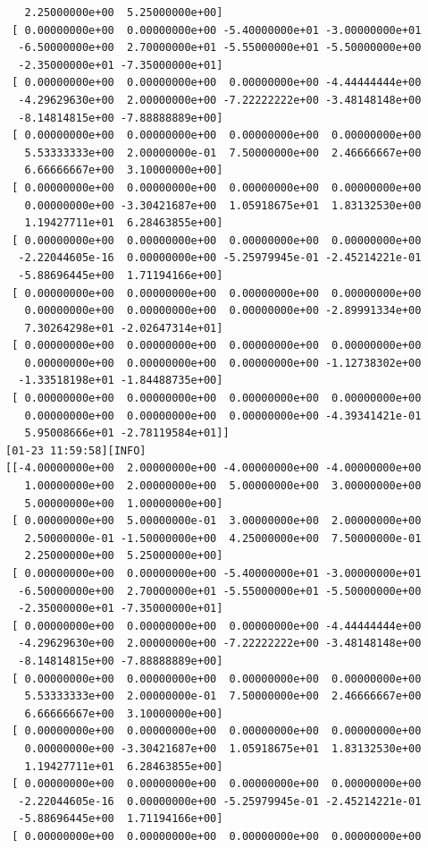 \documentclass[
  letterpaper,
  DIV=11,
  numbers=noendperiod]{scrartcl}
\begin{document}
\begin{verbatim}
   2.25000000e+00  5.25000000e+00]
 [ 0.00000000e+00  0.00000000e+00 -5.40000000e+01 -3.00000000e+01
  -6.50000000e+00  2.70000000e+01 -5.55000000e+01 -5.50000000e+00
  -2.35000000e+01 -7.35000000e+01]
 [ 0.00000000e+00  0.00000000e+00  0.00000000e+00 -4.44444444e+00
  -4.29629630e+00  2.00000000e+00 -7.22222222e+00 -3.48148148e+00
  -8.14814815e+00 -7.88888889e+00]
 [ 0.00000000e+00  0.00000000e+00  0.00000000e+00  0.00000000e+00
   5.53333333e+00  2.00000000e-01  7.50000000e+00  2.46666667e+00
   6.66666667e+00  3.10000000e+00]
 [ 0.00000000e+00  0.00000000e+00  0.00000000e+00  0.00000000e+00
   0.00000000e+00 -3.30421687e+00  1.05918675e+01  1.83132530e+00
   1.19427711e+01  6.28463855e+00]
 [ 0.00000000e+00  0.00000000e+00  0.00000000e+00  0.00000000e+00
  -2.22044605e-16  0.00000000e+00 -5.25979945e-01 -2.45214221e-01
  -5.88696445e+00  1.71194166e+00]
 [ 0.00000000e+00  0.00000000e+00  0.00000000e+00  0.00000000e+00
   0.00000000e+00  0.00000000e+00  0.00000000e+00 -2.89991334e+00
   7.30264298e+01 -2.02647314e+01]
 [ 0.00000000e+00  0.00000000e+00  0.00000000e+00  0.00000000e+00
   0.00000000e+00  0.00000000e+00  0.00000000e+00 -1.12738302e+00
  -1.33518198e+01 -1.84488735e+00]
 [ 0.00000000e+00  0.00000000e+00  0.00000000e+00  0.00000000e+00
   0.00000000e+00  0.00000000e+00  0.00000000e+00 -4.39341421e-01
   5.95008666e+01 -2.78119584e+01]]
[01-23 11:59:58][INFO] 
[[-4.00000000e+00  2.00000000e+00 -4.00000000e+00 -4.00000000e+00
   1.00000000e+00  2.00000000e+00  5.00000000e+00  3.00000000e+00
   5.00000000e+00  1.00000000e+00]
 [ 0.00000000e+00  5.00000000e-01  3.00000000e+00  2.00000000e+00
   2.50000000e-01 -1.50000000e+00  4.25000000e+00  7.50000000e-01
   2.25000000e+00  5.25000000e+00]
 [ 0.00000000e+00  0.00000000e+00 -5.40000000e+01 -3.00000000e+01
  -6.50000000e+00  2.70000000e+01 -5.55000000e+01 -5.50000000e+00
  -2.35000000e+01 -7.35000000e+01]
 [ 0.00000000e+00  0.00000000e+00  0.00000000e+00 -4.44444444e+00
  -4.29629630e+00  2.00000000e+00 -7.22222222e+00 -3.48148148e+00
  -8.14814815e+00 -7.88888889e+00]
 [ 0.00000000e+00  0.00000000e+00  0.00000000e+00  0.00000000e+00
   5.53333333e+00  2.00000000e-01  7.50000000e+00  2.46666667e+00
   6.66666667e+00  3.10000000e+00]
 [ 0.00000000e+00  0.00000000e+00  0.00000000e+00  0.00000000e+00
   0.00000000e+00 -3.30421687e+00  1.05918675e+01  1.83132530e+00
   1.19427711e+01  6.28463855e+00]
 [ 0.00000000e+00  0.00000000e+00  0.00000000e+00  0.00000000e+00
  -2.22044605e-16  0.00000000e+00 -5.25979945e-01 -2.45214221e-01
  -5.88696445e+00  1.71194166e+00]
 [ 0.00000000e+00  0.00000000e+00  0.00000000e+00  0.00000000e+00

\end{verbatim}
\end{document}
